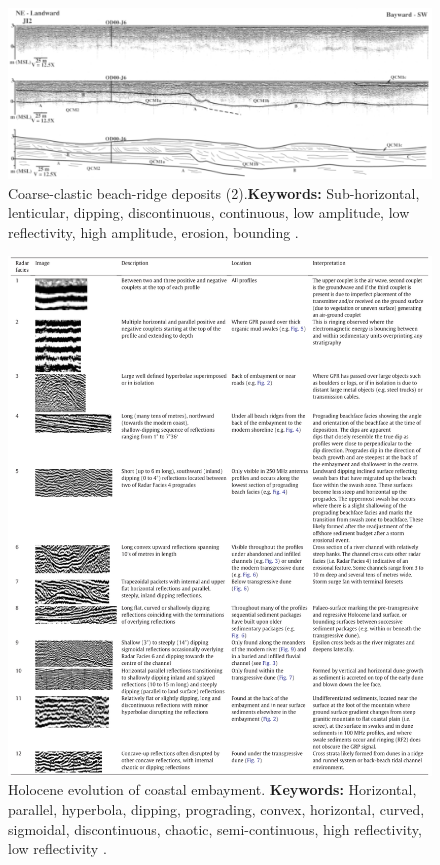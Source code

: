 \begin{landscape}
  \begin{figure}[h!]
    \centering
    \includegraphics[width=0.9\linewidth]{Figures/0.2GPR/neal2003_2.png}
    \caption[Coarse-clastic beach-ridge deposits (2).]{Coarse-clastic beach-ridge deposits (2).\textbf{Keywords: } Sub-horizontal, lenticular, dipping, discontinuous, continuous, low amplitude, low reflectivity, high amplitude, erosion, bounding \citep{Neal2003}.}
    \label{fig:Neal2003-2}
\end{figure}  
\end{landscape}

\begin{figure}[h!]
    \centering
    \includegraphics[width=0.9\linewidth]{Figures/0.2GPR/Gourmanis2020_coastal.png}
    \caption[Holocene evolution of coastal embayment.]{Holocene evolution of coastal embayment. \textbf{Keywords: } Horizontal, parallel, hyperbola, dipping, prograding, convex, horizontal, curved, sigmoidal, discontinuous, chaotic, semi-continuous, high reflectivity, low reflectivity \citep{Guramanis2020}.}
    \label{fig:Gourmanis2020-1}
\end{figure}

